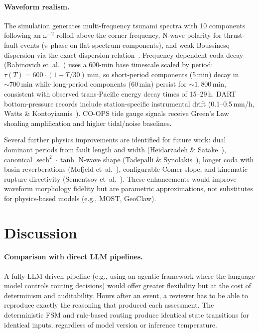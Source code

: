 \documentclass{article}
\begin{document}
\paragraph{Waveform realism.}
The simulation generates multi-frequency tsunami spectra with 10
components following an $\omega^{-2}$ rolloff above the corner frequency,
N-wave polarity for thrust-fault events ($\pi$-phase on flat-spectrum
components), and weak Boussinesq dispersion via the exact dispersion
relation~\citep{kajiura1963leading}.
Frequency-dependent coda decay
(Rabinovich et~al.~\citep{rabinovich2013nearfield}) uses a 600-min
base timescale scaled by period: $\tau(T) = 600 \cdot (1 + T/30)$\,min,
so short-period components (5\,min) decay in ${\sim}700$\,min while
long-period components (60\,min) persist for ${\sim}1{,}800$\,min,
consistent with observed trans-Pacific energy decay times of 15--29\,h.
DART bottom-pressure records include station-specific instrumental
drift (0.1--0.5\,mm/h, Watts \& Kontoyiannis~\citep{watts1990drift}).
CO-OPS tide gauge signals receive Green's Law shoaling amplification
and higher tidal/noise baselines.

Several further physics improvements are identified for future work:
dual dominant periods from fault length and width
(Heidarzadeh \& Satake~\citep{heidarzadeh2013waveform}),
canonical $\operatorname{sech}^2 \cdot \tanh$ N-wave shape
(Tadepalli \& Synolakis~\citep{tadepalli1994model}),
longer coda with basin reverberations
(Mofjeld et~al.~\citep{mofjeld2001scattering}),
configurable Comer slope, and kinematic rupture directivity
(Sementsov et~al.~\citep{sementsov2025kinematic}).
These enhancements would improve waveform morphology fidelity but
are parametric approximations, not substitutes for physics-based
models (e.g., MOST, GeoClaw).


\section{Discussion}
\label{sec:discussion}

\paragraph{Comparison with direct LLM pipelines.}
A fully LLM-driven pipeline (e.g., using an agentic framework where
the language model controls routing decisions) would offer greater
flexibility but at the cost of determinism and auditability. Hours after an event, a reviewer has to be able to reproduce exactly
the reasoning that produced each assessment. The
deterministic FSM and rule-based routing produce identical state
transitions for identical inputs, regardless of model version or
inference temperature.
\end{document}
